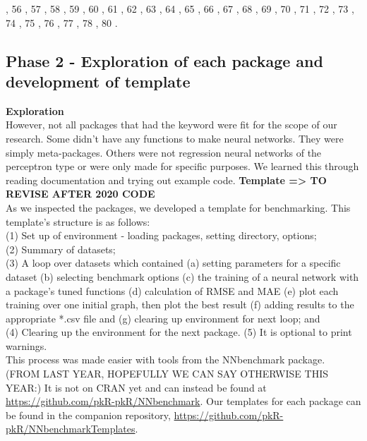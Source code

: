 \citep{R-predictoR}, 56 \citep{R-qrnn},
57 \citep{R-QuantumOps}, 58
\citep{R-quarrint}, 59 \citep{R-radiant.model},
60 \citep{R-rasclass}, 61
\citep{R-rcane}, 62 \citep{R-regressoR},
63 \citep{R-rminer}, 64 \citep{R-rnn},
65 \citep{R-RSNNS}, 66 \citep{R-ruta},
67 \citep{R-simpleNeural}, 68
\citep{R-snnR}, 69 \citep{R-softmaxreg},
70 \citep{R-Sojourn.Data}, 71
\citep{R-spnn}, 72 \citep{R-TeachNet},
73 \citep{R-tensorflow}, 74
\citep{R-tfestimators}, 75 \citep{R-trackdem},
76 \citep{R-TrafficBDE}, 77
\citep{R-tsensembler}, 78 \citep{R-validann},
80 \citep{R-zFactor}.

\hypertarget{phase-2---exploration-of-each-package-and-development-of-template}{%
\subsection{Phase 2 - Exploration of each package and development of
template}\label{phase-2---exploration-of-each-package-and-development-of-template}}

\textbf{Exploration}\\
However, not all packages that had the keyword were fit for the scope of
our research. Some didn't have any functions to make neural networks.
They were simply meta-packages. Others were not regression neural
networks of the perceptron type or were only made for specific purposes.
We learned this through reading documentation and trying out example
code. \textbf{Template =\textgreater{} TO REVISE AFTER 2020 CODE}\\
As we inspected the packages, we developed a template for benchmarking.
This template's structure is as follows:\\
(1) Set up of environment - loading packages, setting directory,
options;\\
(2) Summary of datasets;\\
(3) A loop over datasets which contained (a) setting parameters for a
specific dataset (b) selecting benchmark options (c) the training of a
neural network with a package's tuned functions (d) calculation of RMSE
and MAE (e) plot each training over one initial graph, then plot the
best result (f) adding results to the appropriate *.csv file and (g)
clearing up environment for next loop; and\\
(4) Clearing up the environment for the next package. (5) It is optional
to print warnings.\\
This process was made easier with tools from the NNbenchmark package.
(FROM LAST YEAR, HOPEFULLY WE CAN SAY OTHERWISE THIS YEAR:) It is not on
CRAN yet and can instead be found at
\url{https://github.com/pkR-pkR/NNbenchmark}. Our templates for each
package can be found in the companion repository,
\url{https://github.com/pkR-pkR/NNbenchmarkTemplates}.

